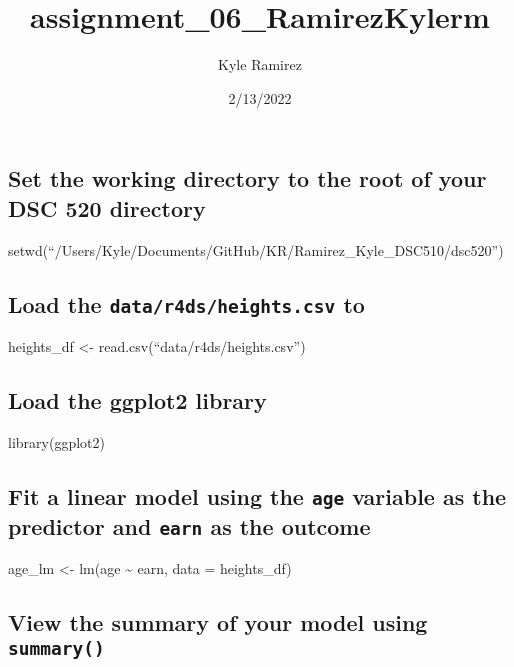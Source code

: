 \documentclass[
]{article}
\title{assignment\_06\_RamirezKylerm}
\author{Kyle Ramirez}
\date{2/13/2022}
\begin{document}
\maketitle

\hypertarget{set-the-working-directory-to-the-root-of-your-dsc-520-directory}{%
\subsection{Set the working directory to the root of your DSC 520
directory}\label{set-the-working-directory-to-the-root-of-your-dsc-520-directory}}

setwd(``/Users/Kyle/Documents/GitHub/KR/Ramirez\_Kyle\_DSC510/dsc520'')

\hypertarget{load-the-datar4dsheights.csv-to}{%
\subsection{\texorpdfstring{Load the \texttt{data/r4ds/heights.csv}
to}{Load the data/r4ds/heights.csv to}}\label{load-the-datar4dsheights.csv-to}}

heights\_df \textless- read.csv(``data/r4ds/heights.csv'')

\hypertarget{load-the-ggplot2-library}{%
\subsection{Load the ggplot2 library}\label{load-the-ggplot2-library}}

library(ggplot2)

\hypertarget{fit-a-linear-model-using-the-age-variable-as-the-predictor-and-earn-as-the-outcome}{%
\subsection{\texorpdfstring{Fit a linear model using the \texttt{age}
variable as the predictor and \texttt{earn} as the
outcome}{Fit a linear model using the age variable as the predictor and earn as the outcome}}\label{fit-a-linear-model-using-the-age-variable-as-the-predictor-and-earn-as-the-outcome}}

age\_lm \textless- lm(age \textasciitilde{} earn, data = heights\_df)

\hypertarget{view-the-summary-of-your-model-using-summary}{%
\subsection{\texorpdfstring{View the summary of your model using
\texttt{summary()}}{View the summary of your model using summary()}}\label{view-the-summary-of-your-model-using-summary}}
\end{document}
